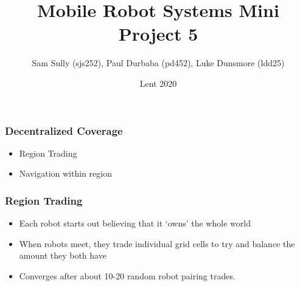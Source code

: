 \documentclass{beamer}
\title{Mobile Robot Systems Mini Project 5}
\author{Sam Sully (sjs252), Paul Durbaba (pd452), Luke Dunsmore (ldd25)}
\date{Lent 2020}
\begin{document}
    
    \begin{frame}
        \frametitle{Decentralized Coverage}
        \begin{itemize}
        \item Region Trading
        \item Navigation within region
        \end{itemize}
    \end{frame}
    
    \begin{frame}
        \frametitle{Region Trading}
        \begin{itemize}
        \item Each robot starts out believing that it `owns' the whole world
        \item When robots meet, they trade individual grid cells to try and balance the amount they both have
        \item Converges after about 10-20 random robot pairing trades.
        \end{itemize}
        
    \end{frame}
    
\end{document}
